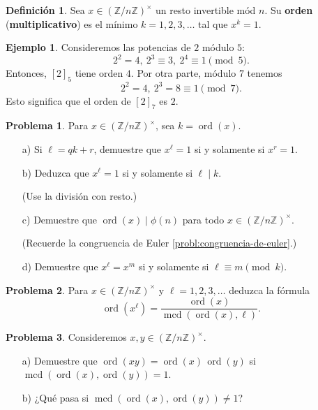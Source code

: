 \documentclass{article}
\newcommand{\ZZ}{\mathbb{Z}}
\DeclareMathOperator{\mcd}{mcd}
\DeclareMathOperator{\ord}{ord}
\theoremstyle{definition}
\newtheorem{problema}{Problema}[section]
\newtheorem*{definicion}{Definición}
\newtheorem*{ejemplo}{Ejemplo}
\begin{document}
\begin{definicion}
  Sea $x \in (\ZZ/n\ZZ)^\times$ un resto invertible mód $n$. Su \textbf{orden}
  (\textbf{multiplicativo}) es el mínimo $k = 1,2,3,\ldots$ tal que
  $x^k = 1$.
\end{definicion}

\begin{ejemplo}
  Consideremos las potencias de $2$ módulo $5$:
  \[
    2^2 = 4, ~
    2^3 \equiv 3, ~
    2^4 \equiv 1 \pmod{5}.
  \]
  Entonces, $[2]_5$ tiene orden $4$. Por otra parte, módulo $7$ tenemos
  \[
    2^2 = 4, ~
    2^3 = 8 \equiv 1 \pmod{7}.
  \]
  Esto significa que el orden de $[2]_7$ es $2$.
\end{ejemplo}

\begin{problema}
  Para $x \in (\ZZ/n\ZZ)^\times$, sea $k = \ord (x)$.

  \begin{enumerate}
  \item[a)] Si $\ell = qk + r$, demuestre que $x^\ell = 1$ si y solamente si
    $x^r = 1$.

  \item[b)] Deduzca que $x^\ell = 1$ si y solamente si $\ell \mid k$.

    (Use la división con resto.)

  \item[c)] Demuestre que $\ord (x) \mid \phi(n)$ para todo
    $x \in (\ZZ/n\ZZ)^\times$.

    (Recuerde la congruencia de Euler \ref{probl:congruencia-de-euler}.)

  \item[d)] Demuestre que $x^\ell = x^m$ si y solamente si
    $\ell \equiv m \pmod{k}$.
  \end{enumerate}
\end{problema}

\begin{problema}
  Para $x \in (\ZZ/n\ZZ)^\times$ y $\ell = 1,2,3,\ldots$ deduzca la fórmula
  $$\ord (x^\ell) = \frac{\ord (x)}{\mcd (\ord (x), \ell)}.$$
\end{problema}

\begin{problema}
  Consideremos $x,y \in (\ZZ/n\ZZ)^\times$.

  \begin{itemize}
  \item[a)] Demuestre que $\ord (xy) = \ord(x) \, \ord(y)$ si
    $\mcd (\ord(x), \ord(y)) = 1$.
  \item[b)] ¿Qué pasa si $\mcd (\ord(x), \ord(y)) \ne 1$?
  \end{itemize}
\end{problema}
\end{document}
